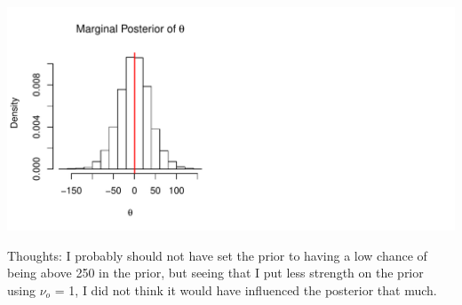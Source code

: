 \documentclass{article}\usepackage[]{graphicx}\usepackage[]{color}
\makeatletter
\def\maxwidth{ %
  \ifdim\Gin@nat@width>\linewidth
    \linewidth
  \else
    \Gin@nat@width
  \fi
}
\makeatother
\begin{document}
\begin{enumerate}
\begin{enumerate}
{\centering \includegraphics[width=\maxwidth]{figure/prob7c3-2} 

}




Thoughts: I probably should not have set the prior to having a low chance of being above 250 in the prior, but seeing that I put less strength on the prior using $\nu_{o}$ = 1, I did not think it would have influenced the posterior that much.

\end{enumerate}
\end{enumerate}
\end{document}
